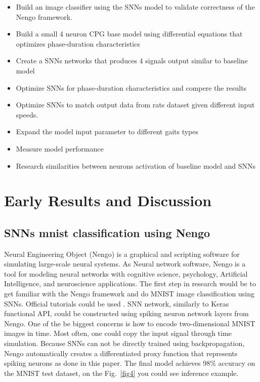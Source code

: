 \documentclass[runningheads]{llncs}
\begin{document}
\begin{itemize}
	\item Build an image classifier using the SNNs model to validate correctness of the Nengo framework.
	\item Build a small 4 neuron CPG base model using differential equations that optimizes phase-duration characteristics
	\item Create a SNNs networks that produces 4 signals output similar to baseline model
	\item Optimize SNNs for phase-duration characteristics and compere the results
	\item Optimize SNNs to match output data from rats dataset given different input speeds.   
	\item Expand the model input parameter to different gaits types 
	\item Measure model performance
	\item Research similarities between neurons activation of baseline model and SNNs 
\end{itemize}

\section{Early Results and Discussion}
\subsection{SNNs mnist classification using Nengo}
 Neural Engineering Object (Nengo) is a graphical and scripting software for simulating large-scale neural systems. As Neural network software, Nengo is a tool for modeling neural networks with cognitive science, psychology, Artificial Intelligence, and neuroscience applications. The first step in research would be to get familiar with the Nengo framework and do MNIST image classification using SNNs. Official tutorials could be used \cite{ref25}. SNN network, similarly to Keras functional API, could be constructed using spiking neuron network layers from Nengo. One of the be biggest concerns is how to encode two-dimensional MNIST images in time. Most often, one could copy the input signal through time simulation. Because SNNs can not be directly trained using backpropagation, Nengo automatically creates a differentiated proxy function that represents spiking neurons as done in this paper\cite{ref26}.
The final model achieves 98\% accuracy on the MNIST test dataset, on the Fig.~\ref{fig4} you could see inference example.
\end{document}
